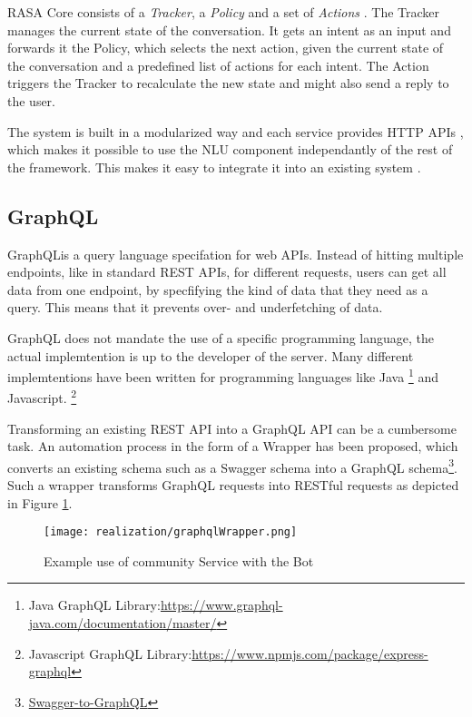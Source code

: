 RASA Core consists of a \emph{Tracker}, a \emph{Policy} and a set of \emph{Actions} \cite{BFPN17}. The Tracker manages the current state of the conversation. It gets an intent as an input and forwards it the Policy, which selects the next action, given the current state of the conversation and a predefined list of actions for each intent. The Action triggers the Tracker to recalculate the new state and might also send a reply to the user.

The system is built in a modularized way and each service provides HTTP APIs \cite{BFPN17}, which makes it possible to use the NLU component independantly of the rest of the framework. This makes it easy to integrate it into an existing system \cite{RaKe19}.




\subsection{GraphQL}
GraphQL\footnotemark is a query language specifation for web APIs.
Instead of hitting multiple endpoints, like in standard REST APIs, for different requests, users can get all data from one endpoint, by specfifying the kind of data that they need as a query. This means that it prevents over- and underfetching of data.\footnotemark


GraphQL does not mandate the use of a specific programming language, the actual implemtention is up to the developer of the server. \footnotemark
{}
Many different implemtentions have been written for programming languages like Java \footnote{Java GraphQL Library:\href{https://www.graphql-java.com/documentation/master/}{https://www.graphql-java.com/documentation/master/}} and Javascript. \footnote{Javascript GraphQL Library:\href{https://www.npmjs.com/package/express-graphql}{https://www.npmjs.com/package/express-graphql}}

Transforming an existing REST API into a GraphQL API can be a cumbersome task. An automation process in the form of a Wrapper has been proposed, which converts an existing schema such as a Swagger schema into a GraphQL schema\footnote{\href{https://github.com/yarax/swagger-to-graphql}{Swagger-to-GraphQL}}. Such a wrapper transforms GraphQL requests into RESTful requests as depicted in Figure \ref{fig:graphqlWrapper}.
\begin{figure}[h]
    \centering
    \texttt{[image: realization/graphqlWrapper.png]}
    \caption{Example use of community Service with the Bot}
    \label{fig:graphqlWrapper}
\end{figure}

